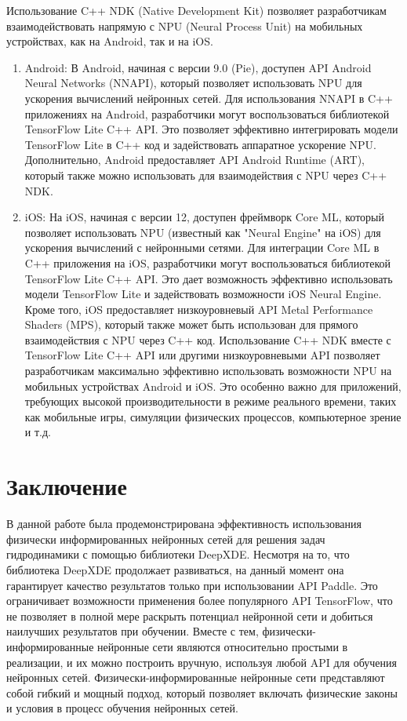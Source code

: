 Использование C++ NDK (Native Development Kit) позволяет разработчикам взаимодействовать напрямую с NPU (Neural Process Unit) на мобильных устройствах, как на Android, так и на iOS.
\begin{enumerate}
    \item 
    Android:
    \subitem
    В Android, начиная с версии 9.0 (Pie), доступен API Android Neural Networks (NNAPI), который позволяет использовать NPU
    для ускорения вычислений нейронных сетей.
    Для использования NNAPI в C++ приложениях на Android, разработчики могут воспользоваться библиотекой TensorFlow Lite C++ API.
    Это позволяет эффективно интегрировать модели TensorFlow Lite в C++ код и задействовать аппаратное ускорение NPU.
    Дополнительно, Android предоставляет API Android Runtime (ART), который также можно использовать для взаимодействия с NPU через C++ NDK.
    \item
    iOS:
    \subitem
    На iOS, начиная с версии 12, доступен фреймворк Core ML, который позволяет использовать NPU (известный как "Neural Engine" на iOS) 
    для ускорения вычислений с нейронными сетями.
    Для интеграции Core ML в C++ приложения на iOS, разработчики могут воспользоваться библиотекой TensorFlow Lite C++ API. Это дает 
    возможность эффективно использовать модели TensorFlow Lite и задействовать возможности iOS Neural Engine.
    Кроме того, iOS предоставляет низкоуровневый API Metal Performance Shaders (MPS), который также может быть использован для прямого взаимодействия
    с NPU через C++ код.
    Использование C++ NDK вместе с TensorFlow Lite C++ API или другими низкоуровневыми API позволяет разработчикам максимально
    эффективно использовать возможности NPU на мобильных устройствах Android и iOS. Это особенно важно для приложений, требующих
    высокой производительности в режиме реального времени, таких как мобильные игры, симуляции физических процессов, компьютерное зрение и т.д.
\end{enumerate}

\chapter{Заключение}
В данной работе была продемонстрирована эффективность использования физически информированных нейронных сетей для решения задач гидродинамики с помощью библиотеки DeepXDE.
Несмотря на то, что библиотека DeepXDE продолжает развиваться, на данный момент она гарантирует качество результатов только при использовании API Paddle.
Это ограничивает возможности применения более популярного API TensorFlow, что не позволяет в полной мере раскрыть потенциал нейронной сети и добиться наилучших
результатов при обучении. Вместе с тем, физически-информированные нейронные сети являются относительно простыми в реализации, и их можно построить вручную,
используя любой API для обучения нейронных сетей. 
Физически-информированные нейронные сети представляют собой гибкий и мощный подход, который позволяет включать физические законы и условия в процесс обучения нейронных сетей.


